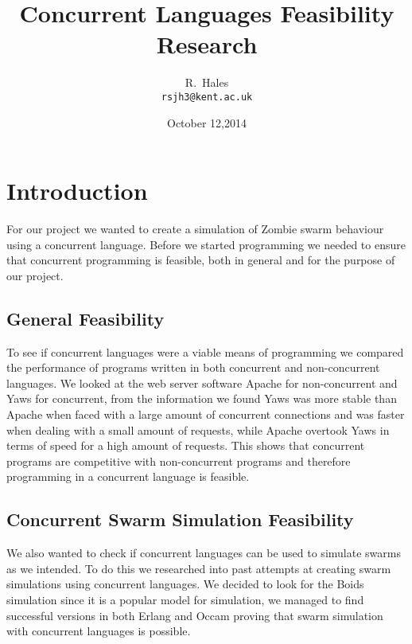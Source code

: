\documentclass[a4paper,12pt]{article}
\begin{document}
\title{Concurrent Languages Feasibility Research}
\author{R.~Hales\\{\small\tt rsjh3@kent.ac.uk}}
\date{October 12,2014}

\maketitle

\section{Introduction}
For our project we wanted to create a simulation of Zombie swarm behaviour using a concurrent language. Before we started programming we needed to ensure that concurrent programming is  feasible, both in general and for the purpose of our project.

\subsection{General Feasibility}
To see if concurrent languages were a viable means of programming we compared the performance of programs written in both concurrent and non-concurrent languages. We looked at the web server software Apache for non-concurrent and Yaws for concurrent, from the information we found Yaws was more stable than Apache when faced with a large amount of concurrent connections and was faster when dealing with a small amount of requests, while Apache overtook Yaws in terms of speed for a high amount of requests. This shows that concurrent programs are competitive with non-concurrent programs and therefore programming in a concurrent language is feasible.
\subsection{Concurrent Swarm Simulation Feasibility}
We also wanted to check if concurrent languages can be used to simulate swarms as we intended. To do this we researched into past attempts at creating swarm simulations using concurrent languages. We decided to look for the Boids simulation since it is a popular model for simulation, we managed to find successful versions in both Erlang and Occam proving that swarm simulation with concurrent languages is possible.
\end{document}
